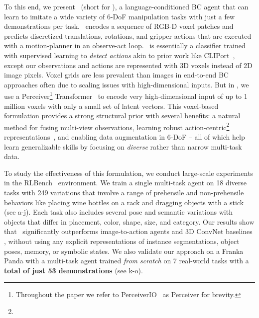 To this end, we present \model~(short for \modelfullns), a language-conditioned BC agent that can learn to imitate a wide variety of 6-DoF manipulation tasks with just a few demonstrations per task. \model~encodes a sequence of RGB-D voxel patches and predicts discretized translations, rotations, and gripper actions that are executed with a motion-planner in an observe-act loop. \model~is essentially a classifier trained with supervised learning to \textit{detect actions} akin to prior work like CLIPort~\citep{cliport,zengTransporterNetworksRearranging2021},
except our observations and actions are represented with 3D voxels instead of 2D image pixels. 
Voxel grids are  less prevalent than images in end-to-end BC approaches often due to scaling issues with high-dimensional inputs. But in \model, we use a Perceiver\footnote{Throughout the paper we refer to PerceiverIO~\citep{jaegle2021perceiver} as Perceiver for brevity.} Transformer~\citep{jaegle2021perceiver} to encode very high-dimensional input of up to 1 million voxels with only a small set of latent vectors. This voxel-based formulation provides a strong structural prior with several benefits: a natural method for fusing multi-view observations, learning robust action-centric\footnote{} representations~\citep{gibson2014ecological,brooks1991new}, and enabling data augmentation in 6-DoF -- all of which help learn generalizable skills by focusing on \textit{diverse} rather than narrow multi-task data.  

To study the effectiveness of this formulation, we conduct large-scale experiments in the RLBench~\citep{james2020rlbench} environment. We train a single multi-task agent on 18 diverse tasks with 249 variations that involve a range of prehensile and non-prehensile behaviors like placing wine bottles on a rack and dragging objects with a stick (see  a-j). Each task also includes several pose and semantic variations with objects that differ in placement, color, shape, size, and category. 
Our results show that \model~significantly outperforms image-to-action agents  and 3D ConvNet baselines , without using any explicit representations of instance segmentations, object poses, memory, or symbolic states. 
We also validate our approach on a Franka Panda with a multi-task agent trained \textit{from scratch} on 7 real-world tasks  with a \textbf{total of just 53 demonstrations} (see  k-o).

